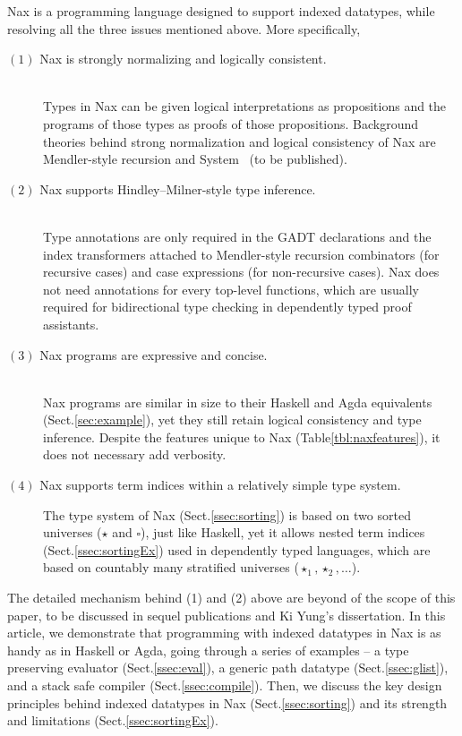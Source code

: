Nax is a programming language designed to support indexed datatypes,
while resolving all the three issues mentioned above.
More specifically,
\begin{description}
\item[$(1)$ Nax is strongly normalizing and logically consistent.]~\\
Types in Nax can be given logical interpretations as propositions
and the programs of those types as proofs of those propositions.
Background theories behind strong normalization and logical consistency of Nax
are Mendler-style recursion \cite{AhnShe11} and System \Fi\ (to be published).

\item[$(2)$ Nax supports Hindley--Milner-style type inference.]~\\
Type annotations are only required in the GADT declarations and
the index transformers attached to Mendler-style recursion combinators
(for recursive cases) and case expressions (for non-recursive cases).
Nax does not need annotations for every top-level functions, which are usually
required for bidirectional type checking in dependently typed proof assistants.

\item[$(3)$ Nax programs are expressive and concise.]~\\
Nax programs are similar in size to their Haskell and Agda equivalents
(Sect.\;\ref{sec:example}), yet they still retain logical consistency
and type inference. Despite the features unique to Nax
(Table\;\ref{tbl:naxfeatures}), it does not necessary add verbosity.

\item[$(4)$ Nax supports term indices within a relatively simple type system.]
The type system of Nax (Sect.\;\ref{ssec:sorting}) is based on
two sorted universes ($\star$ and $\square$), just like Haskell,
yet it allows nested term indices (Sect.\;\ref{ssec:sortingEx})
used in dependently typed languages, which are based on countably many
stratified universes ($\star_1,\star_2,\dots$).
\end{description}
The detailed mechanism behind (1) and (2) above are beyond of the scope of
this paper, to be discussed in sequel publications and Ki Yung's dissertation.
In this article, we demonstrate that programming with indexed datatypes in Nax
is as handy as in Haskell or Agda, going through a series of examples --
a type preserving evaluator (Sect.\;\ref{ssec:eval}),
a generic path datatype (Sect.\;\ref{ssec:glist}), and
a stack safe compiler (Sect.\;\ref{ssec:compile}).
Then, we discuss the key design principles behind indexed datatypes in Nax
(Sect.\;\ref{ssec:sorting}) and its strength and limitations
(Sect.\;\ref{ssec:sortingEx}).


